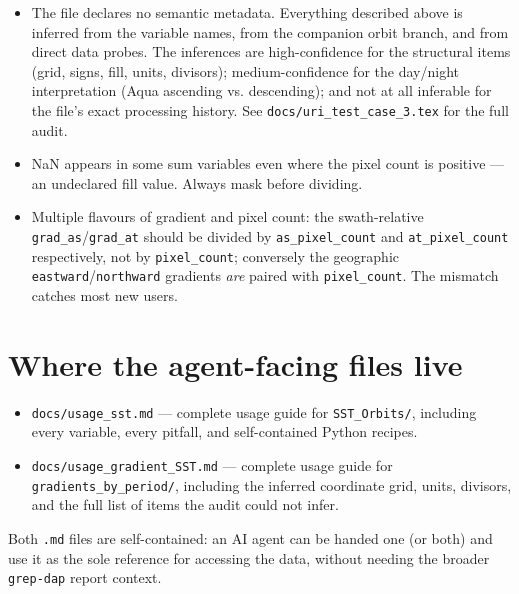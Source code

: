\documentclass[11pt]{article}
\begin{document}
\begin{itemize}
  \item The file declares no semantic metadata. Everything described
    above is inferred from the variable names, from the companion
    orbit branch, and from direct data probes. The inferences are
    high-confidence for the structural items (grid, signs, fill,
    units, divisors); medium-confidence for the day/night
    interpretation (Aqua ascending vs. descending); and not at all
    inferable for the file's exact processing history. See
    \texttt{docs/uri\_test\_case\_3.tex} for the full audit.
  \item NaN appears in some sum variables even where the pixel
    count is positive --- an undeclared fill value. Always mask
    before dividing.
  \item Multiple flavours of gradient and pixel count: the
    swath-relative \texttt{grad\_as}/\texttt{grad\_at} should be
    divided by \texttt{as\_pixel\_count} and \texttt{at\_pixel\_count}
    respectively, not by \texttt{pixel\_count}; conversely the
    geographic \texttt{eastward}/\texttt{northward} gradients
    \emph{are} paired with \texttt{pixel\_count}. The mismatch
    catches most new users.
\end{itemize}

\section{Where the agent-facing files live}

\begin{itemize}
  \item \texttt{docs/usage\_sst.md} --- complete usage guide for
    \texttt{SST\_Orbits/}, including every variable, every pitfall,
    and self-contained Python recipes.
  \item \texttt{docs/usage\_gradient\_SST.md} --- complete usage
    guide for \texttt{gradients\_by\_period/}, including the
    inferred coordinate grid, units, divisors, and the full
    list of items the audit could not infer.
\end{itemize}

Both \texttt{.md} files are self-contained: an AI agent can be
handed one (or both) and use it as the sole reference for accessing
the data, without needing the broader \texttt{grep-dap} report
context.
\end{document}
